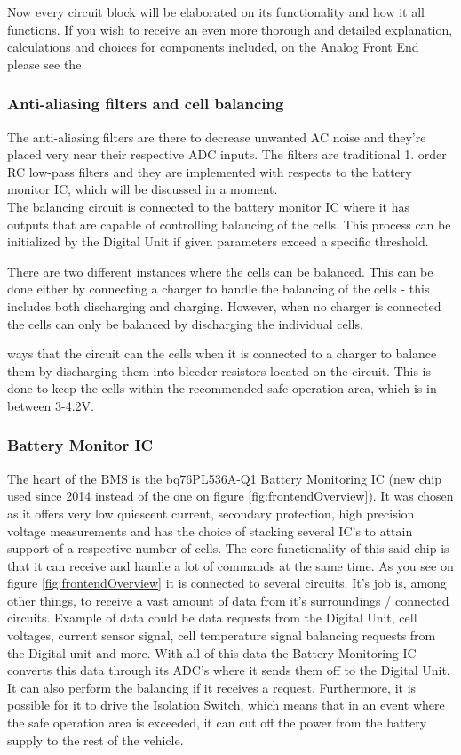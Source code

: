 Now every circuit block will be elaborated on its functionality and how it all functions. If you wish to receive an even more thorough and detailed explanation, calculations and choices for components included, on the Analog Front End please see the \\

\subsubsection{Anti-aliasing filters and cell balancing}
The anti-aliasing filters are there to decrease unwanted AC noise and they're placed very near their respective ADC inputs. The filters are traditional 1. order RC low-pass filters and they are implemented with respects to the battery monitor IC, which will be discussed in a moment.\\
The balancing circuit is connected to the battery monitor IC where it has outputs that are capable of controlling balancing of the cells. This process can be initialized by the Digital Unit if given parameters exceed a specific threshold.

There are two different instances where the cells can be balanced. This can be done either by connecting a charger to handle the balancing of the cells - this includes both discharging and charging. However, when no charger is connected the cells can only be balanced by discharging the individual cells.

ways that the circuit can  the cells  when it is connected to a charger to balance them by discharging them into bleeder resistors located on the circuit. This is done to keep the cells within the recommended safe operation area, which is in between 3-4.2V.



\subsubsection{Battery Monitor IC}
The heart of the BMS is the bq76PL536A-Q1 Battery Monitoring IC (new chip used since 2014 instead of the one on figure \ref{fig:frontendOverview}). It was chosen as it offers very low quiescent current, secondary protection, high precision voltage measurements and has the choice of stacking several IC's to attain support of a respective number of cells. The core functionality of this said chip is that it can receive and handle a lot of commands at the same time. As you see on figure \ref{fig:frontendOverview} it is connected to several circuits. It's job is, among other things, to receive a vast amount of data from it's surroundings / connected circuits. Example of data could be data requests from the Digital Unit, cell voltages, current sensor signal, cell temperature signal balancing requests from the Digital unit and more. With all of this data the Battery Monitoring IC converts this data through its ADC's where it sends them off to the Digital Unit. It can also perform the balancing if it receives a request. Furthermore, it is possible for it to drive the Isolation Switch, which means that in an event where the safe operation area is exceeded, it can cut off the power from the battery supply to the rest of the vehicle.

